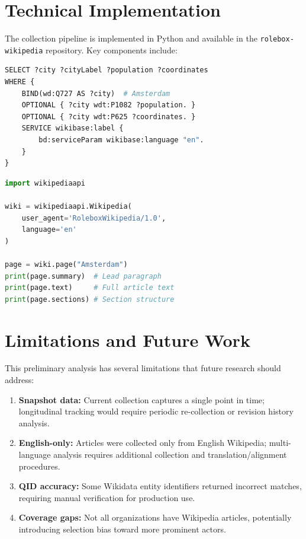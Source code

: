 \section{Technical Implementation}

The collection pipeline is implemented in Python and available in the \texttt{rolebox-wikipedia} repository. Key components include:

\begin{lstlisting}[language=Python, caption={Wikidata SPARQL query for city attributes}, label={lst:sparql-city}]
SELECT ?city ?cityLabel ?population ?coordinates
WHERE {
    BIND(wd:Q727 AS ?city)  # Amsterdam
    OPTIONAL { ?city wdt:P1082 ?population. }
    OPTIONAL { ?city wdt:P625 ?coordinates. }
    SERVICE wikibase:label {
        bd:serviceParam wikibase:language "en".
    }
}
\end{lstlisting}

\begin{lstlisting}[language=Python, caption={Wikipedia article content retrieval}, label={lst:wikipedia-api}]
import wikipediaapi

wiki = wikipediaapi.Wikipedia(
    user_agent='RoleboxWikipedia/1.0',
    language='en'
)

page = wiki.page("Amsterdam")
print(page.summary)  # Lead paragraph
print(page.text)     # Full article text
print(page.sections) # Section structure
\end{lstlisting}

\section{Limitations and Future Work}

This preliminary analysis has several limitations that future research should address:

\begin{enumerate}
    \item \textbf{Snapshot data:} Current collection captures a single point in time; longitudinal tracking would require periodic re-collection or revision history analysis.

    \item \textbf{English-only:} Articles were collected only from English Wikipedia; multi-language analysis requires additional collection and translation/alignment procedures.

    \item \textbf{QID accuracy:} Some Wikidata entity identifiers returned incorrect matches, requiring manual verification for production use.

    \item \textbf{Coverage gaps:} Not all organizations have Wikipedia articles, potentially introducing selection bias toward more prominent actors.
\end{enumerate}

